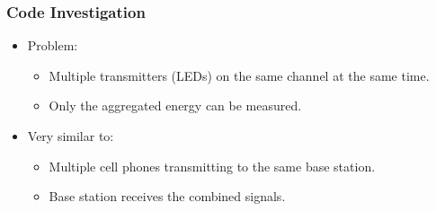\documentclass{beamer}
\begin{document}
	\begin{frame}\frametitle{Code Investigation}

		\begin{itemize}
			\item Problem:
			\begin{itemize}

				\item Multiple transmitters (LEDs) on the same channel at the same time.

				\item Only the aggregated energy can be measured.
			\end{itemize}

			\item Very similar to:

			\begin{itemize}

				\item Multiple cell phones transmitting to the same base station.

				\item Base station receives the combined signals.

			\end{itemize}
		\end{itemize}

	\end{frame}






\end{document}
